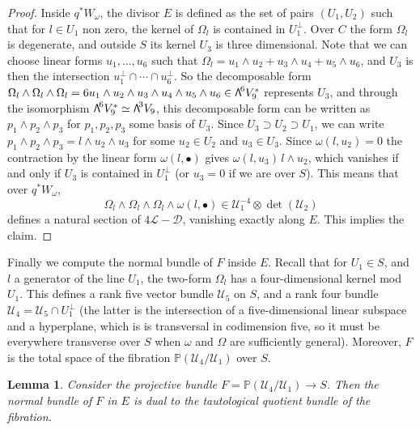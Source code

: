 \documentclass[11pt]{article}
\newcommand{\sbullet}{{\scriptstyle\bullet}}
\newcommand\bw[1]{{\hbox{\large$\mathsf{\Lambda}$}^{\!#1}}}
\let\mathcal\mathscr
\theoremstyle{plain}
\newtheorem{lemma}[theorem]{Lemma}
\theoremstyle{definition}
\newcommand{\PP}{\mathbb{P}}
\newcommand{\sheaf}[1]{\mathcal{#1}}
\newcommand{\kd}{\sheaf{D}}
\newcommand{\kl}{\sheaf{L}}
\newcommand{\ku}{\sheaf{U}}
\begin{document}
\begin{proof}
Inside $q^*W_\omega$, the divisor $E$ is defined as the set of pairs $(U_1,U_2)$ such that
for $l\in U_1$ non zero, the kernel
of $\Omega_l$ is contained in $U_1^\perp$. Over $C$ the form $\Omega_l$ is degenerate, and outside
$S$ its kernel $U_3$ is three dimensional. Note that we can choose linear forms $u_1,\ldots ,u_6$
such that $\Omega_l=u_1\wedge u_2+u_3\wedge u_4+u_5\wedge u_6$, and $U_3$ is then the intersection $u_1^\perp\cap\cdots \cap u_6^\perp$. So the decomposable form $\Omega_l\wedge \Omega_l\wedge \Omega_l = 6u_1\wedge u_2\wedge u_3\wedge u_4\wedge u_5\wedge u_6\in\bw6V_9^*$ represents $U_3$, and
through the isomorphism $\bw6V_9^*\simeq \bw3V_9$, this decomposable
form can be written as $p_1\wedge p_2\wedge p_3$ for $p_1, p_2, p_3$ some basis of $U_3$.
Since $U_3\supset U_2\supset U_1$, we can write
$p_1\wedge p_2\wedge p_3=l\wedge u_2\wedge u_3$ for some $u_2\in U_2$ and $u_3\in U_3$. Since $\omega(l,u_2)=0$ the contraction
by the linear form $\omega(l,\sbullet)$ gives $\omega(l,u_3)\, l\wedge u_2$, which vanishes if
and only if $U_3$ is contained in $U_1^\perp$ (or $u_3=0$ if we are over $S$).
This means that over $q^*W_\omega$,
\[
\Omega_l\wedge \Omega_l\wedge \Omega_l\wedge\omega(l,\sbullet)\in \ku_1^{-4}\otimes \det(\ku_2)
\] defines a natural section of $4\kl-\kd$, vanishing exactly along $E$.
This implies the claim.
\end{proof}

Finally we compute the normal bundle of $F$ inside $E$. Recall that for $U_1\in S$, and~$l$ a generator of the line $U_1$, the two-form $\Omega_l$ has a four-dimensional kernel mod $U_1$. This defines a rank five vector bundle $\ku_5$ on $S$, and a rank four bundle $\ku_4=\ku_5
\cap U_1^\perp$ (the latter is the intersection of a five-dimensional linear subspace and a hyperplane, which is
is transversal in codimension five, so it must be everywhere transverse over $S$ when $\omega$ and $\Omega $ are sufficiently
general). Moreover, $F$ is the total space of the fibration $\PP (\ku_4/\ku_1)$ over $S$.

\begin{lemma}\label{normalF}
Consider the projective bundle $F=\PP (\ku_4/\ku_1)\to S$. Then
the normal bundle of $F$ in $E$ is dual to the tautological quotient
bundle of the fibration.
\end{lemma}
\end{document}
